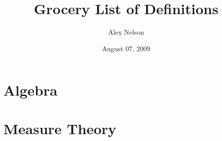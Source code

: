 \documentclass{amsbook}
\title{Grocery List of Definitions}
\date{August 07, 2009}
\author{Alex Nelson}
\begin{document}
\maketitle
\chapter{Algebra}

\chapter{Measure Theory}




\nocite{*}


\end{document}
